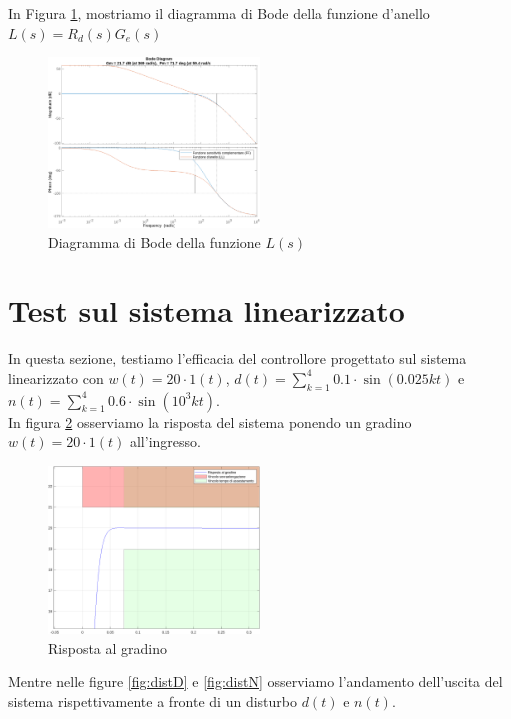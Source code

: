 \documentclass[a4paper, 11pt]{article}
\begin{document}
In Figura \ref{fig:L_s}, mostriamo il diagramma di Bode della funzione d'anello $L(s) = R_d(s) G_e(s)$

\begin{figure}[h]
\centering
\includegraphics[width=0.5\textwidth]{images/Figure_4.png}
\caption{Diagramma di Bode della funzione $L(s)$}
\label{fig:L_s}
\end{figure}






\section{Test sul sistema linearizzato}

In questa sezione, testiamo l'efficacia del controllore progettato sul sistema linearizzato con $w(t) = 20 \cdot 
 1(t) $, $d(t)= \sum_{k=1}^4 0.1 \cdot \sin(0.025kt)$ e $n(t)= \sum_{k=1}^4 0.6 \cdot \sin(10^3 kt)  $. 
 \\
 In figura \ref{fig:grad1} osserviamo la risposta del sistema ponendo un gradino $ w(t) = 20 \cdot 1(t)$ all'ingresso. 
 

 
\begin{figure}[h]
\centering
\includegraphics[width=0.5\textwidth]{images/Figure_5.png}
\caption{Risposta al gradino}
\label{fig:grad1}
\end{figure}

Mentre nelle figure \ref{fig:distD} e \ref{fig:distN} osserviamo l'andamento dell'uscita del sistema rispettivamente a fronte di un disturbo $ d(t) $ e $n(t)$. 
\end{document}
